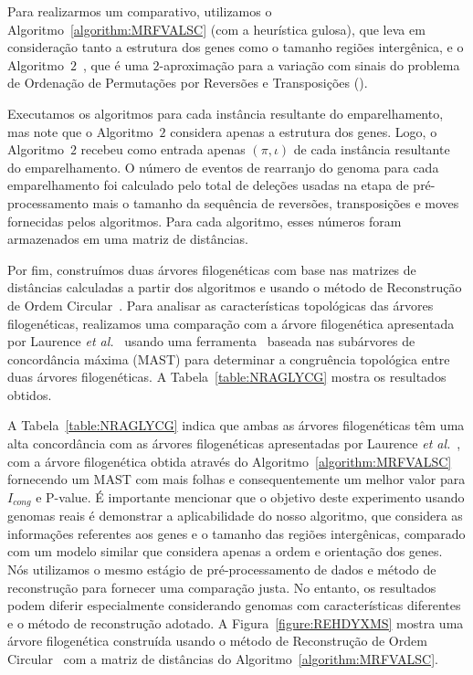 Para realizarmos um comparativo, utilizamos o Algoritmo~\ref{algorithm:MRFVALSC} (com a heurística gulosa), que leva em consideração tanto a estrutura dos genes como o tamanho regiões intergênica, e o Algoritmo~$2$\SbRT{}~\cite{1998-walter-etal}, que é uma $2$-aproximação para a variação com sinais do problema de Ordenação de Permutações por Reversões e Transposições (\SbRT).

Executamos os algoritmos para cada instância resultante do emparelhamento, mas note que o Algoritmo~$2$\SbRT{} considera apenas a estrutura dos genes. Logo, o Algoritmo~$2$\SbRT{} recebeu como entrada apenas $(\pi,\iota)$ de cada instância resultante do emparelhamento. O número de eventos de rearranjo do genoma para cada emparelhamento foi calculado pelo total de deleções usadas na etapa de pré-processamento mais o tamanho da sequência de reversões, transposições e moves fornecidas pelos algoritmos. Para cada algoritmo, esses números foram armazenados em uma matriz de distâncias.

Por fim, construímos duas árvores filogenéticas com base nas matrizes de distâncias calculadas a partir dos algoritmos e usando o método de Reconstrução de Ordem Circular~\cite{makarenkov1997tree}. Para analisar as características topológicas das árvores filogenéticas, realizamos uma comparação com a árvore filogenética apresentada por Laurence \textit{et al.}~\cite{garczarek2020cyanorak} usando uma ferramenta~\cite{de2007congruence} baseada nas subárvores de concordância máxima (MAST) para determinar a congruência topológica entre duas árvores filogenéticas. A Tabela~\ref{table:NRAGLYCG} mostra os resultados obtidos.



A Tabela~\ref{table:NRAGLYCG} indica que ambas as árvores filogenéticas têm uma alta concordância com as árvores filogenéticas apresentadas por Laurence \textit{et al.}~\cite{garczarek2020cyanorak}, com a árvore filogenética obtida através do Algoritmo~\ref{algorithm:MRFVALSC} fornecendo um MAST com mais folhas e consequentemente um melhor valor para $I_{cong}$ e P-value. É importante mencionar que o objetivo deste experimento usando genomas reais é demonstrar a aplicabilidade do nosso algoritmo, que considera as informações referentes aos genes e o tamanho das regiões intergênicas, comparado com um modelo similar que considera apenas a ordem e orientação dos genes. Nós utilizamos o mesmo estágio de pré-processamento de dados e método de reconstrução para fornecer uma comparação justa. No entanto, os resultados podem diferir especialmente considerando genomas com características diferentes e o método de reconstrução adotado. A Figura~\ref{figure:REHDYXMS} mostra uma árvore filogenética construída usando o método de Reconstrução de Ordem Circular~\cite{makarenkov1997tree} com a matriz de distâncias do Algoritmo~\ref{algorithm:MRFVALSC}.

